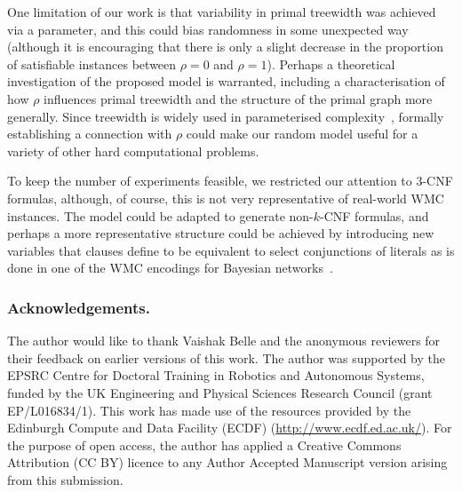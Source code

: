 \documentclass[runningheads]{llncs}
\begin{document}
One limitation of our work is that variability in primal treewidth was achieved
via a parameter, and this could bias randomness in some unexpected way (although
it is encouraging that there is only a slight decrease in the proportion of
satisfiable instances between $\rho=0$ and $\rho = 1$). Perhaps a theoretical
investigation of the proposed model is warranted, including a characterisation
of how $\rho$ influences primal treewidth and the structure of the primal graph
more generally. Since treewidth is widely used in parameterised
complexity~\cite{DBLP:series/txcs/DowneyF13}, formally establishing a connection
with $\rho$ could make our random model useful for a variety of other hard
computational problems.

To keep the number of experiments feasible, we restricted our attention to 3-CNF
formulas, although, of course, this is not very representative of real-world
\textsf{WMC} instances. The model could be adapted to generate non-$k$-CNF
formulas, and perhaps a more representative structure could be achieved by
introducing new variables that clauses define to be equivalent to select
conjunctions of literals as is done in one of the \textsf{WMC} encodings for
Bayesian networks~\cite{DBLP:conf/kr/Darwiche02}.


\subsubsection{Acknowledgements.}
The author would like to thank Vaishak Belle and the anonymous reviewers for
their feedback on earlier versions of this work. The author was supported by the
EPSRC Centre for Doctoral Training in Robotics and Autonomous Systems, funded by
the UK Engineering and Physical Sciences Research Council (grant EP/L016834/1).
This work has made use of the resources provided by the Edinburgh Compute and
Data Facility (ECDF) (\url{http://www.ecdf.ed.ac.uk/}). For the purpose of open
access, the author has applied a Creative Commons Attribution (CC BY) licence to
any Author Accepted Manuscript version arising from this submission.



\end{document}
